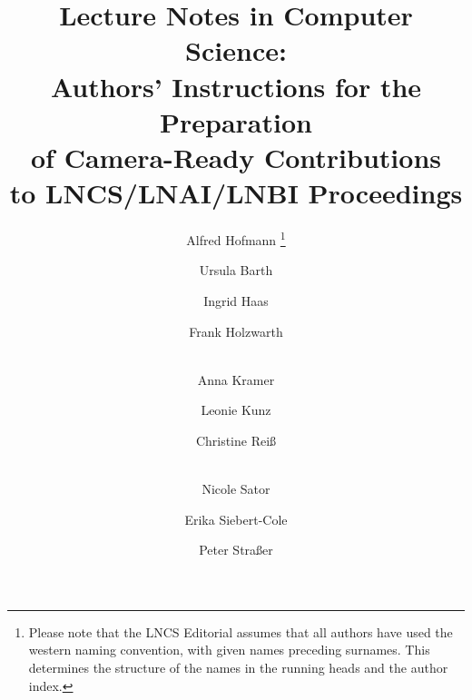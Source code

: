 \documentclass[runningheads,a4paper]{llncs}
\begin{document}
\mainmatter  %

\title{Lecture Notes in Computer Science:\\Authors' Instructions
for the Preparation\\of Camera-Ready
Contributions\\to LNCS/LNAI/LNBI Proceedings}


%
%
\author{Alfred Hofmann%
\thanks{Please note that the LNCS Editorial assumes that all authors have used
the western naming convention, with given names preceding surnames. This determines
the structure of the names in the running heads and the author index.}%
\and Ursula Barth\and Ingrid Haas\and Frank Holzwarth\and\\
Anna Kramer\and Leonie Kunz\and Christine Rei\ss\and\\
Nicole Sator\and Erika Siebert-Cole\and Peter Stra\ss er}
%


%
%

\maketitle
\end{document}
